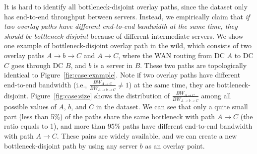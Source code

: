 It is hard to identify all bottleneck-disjoint overlay paths,
since the dataset only has end-to-end throughput between servers.
Instead, we empirically claim that {\em if two overlay paths have different end-to-end bandwidth at the same time, they should be bottleneck-disjoint} because of different intermediate servers.
We show one example of bottleneck-disjoint overlay path in the wild, which consists of two overlay
paths $A$$\rightarrow$$b$$\rightarrow$$C$ and $A$$\rightarrow$$C$,
where the WAN routing from DC $A$ to DC $C$ goes through DC $B$,
and $b$ is a server in $B$.
These two paths are topologically identical to
Figure~\ref{fig:case:example}.
Note if two overlay paths have different end-to-end bandwidth
(i.e., $\frac{BW_{A\rightarrow C}}{BW_{A\rightarrow b\rightarrow C}}\neq1$)
at the same time,
they are bottleneck-disjoint.
Figure~\ref{fig:case:size} shows the distribution of
$\frac{BW_{A\rightarrow C}}{BW_{A\rightarrow b\rightarrow C}}$
among all possible values of $A$, $b$, and $C$ in the dataset.
We can see that only a quite small part (less than 5\%) of the paths share the same bottleneck with path $A\rightarrow C$ (the ratio equals to 1), and more than 95\% paths have different end-to-end bandwidth with path $A\rightarrow C$.
These pairs are widely available, and we can create a new bottleneck-disjoint path by using any server $b$
as an overlay point.




